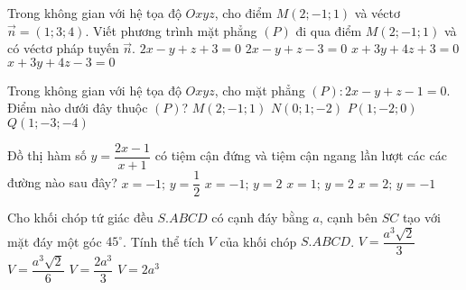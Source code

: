 \begin{ex}%
	Trong không gian với hệ tọa độ $Oxyz$, cho điểm $M(2;-1;1)$ và véctơ $\overrightarrow{n}=(1;3;4)$. Viết phương trình mặt phẳng $(P)$ đi qua điểm $M(2;-1;1)$ và có véctơ pháp tuyến $\overrightarrow{n}$.
	\choice
	{$2x-y+z+3=0$}
	{$2x-y+z-3=0$}
	{$x+3y+4z+3=0$}
	{\True $x+3y+4z-3=0$}
\end{ex}

\begin{ex}%
	Trong không gian với hệ tọa độ $Oxyz$, cho mặt phẳng $(P): 2x-y+z-1=0$. Điểm nào dưới đây thuộc $(P)$?
	\choice
	{$M(2;-1;1)$}
	{$N(0;1;-2)$}
	{$P(1;-2;0)$}
	{\True $Q(1;-3;-4)$}
\end{ex}

\begin{ex}%
	Đồ thị hàm số $y=\dfrac{2x-1}{x+1}$ có tiệm cận đứng và tiệm cận ngang lần lượt các các đường nào sau đây?
	\choice
	{$x=-1;\, y=\dfrac{1}{2}$}
	{\True $x=-1;\, y=2$}
	{$x=1;\, y=2$}
	{$x=2;\, y=-1$}
\end{ex}

\begin{ex}%
	Cho khối chóp tứ giác đều $S.ABCD$ có cạnh đáy bằng $a$, cạnh bên $SC$ tạo với mặt đáy một góc $45^{\circ}$. Tính thể tích $V$ của khối chóp $S.ABCD$.
	\choice
	{$V=\dfrac{a^3\sqrt{2}}{3}$}
	{\True $V=\dfrac{a^3\sqrt{2}}{6}$}
	{$V=\dfrac{2a^3}{3}$}
	{$V=2a^3$}
\end{ex}

